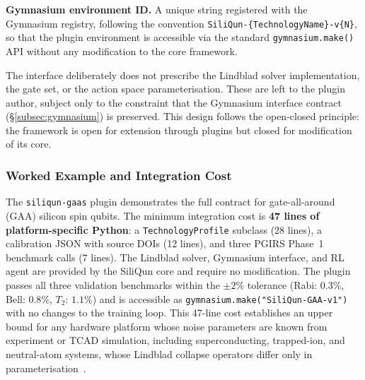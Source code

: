 \textbf{Gymnasium environment ID.} A unique string registered with the
Gymnasium registry, following the convention
\texttt{SiliQun-\{TechnologyName\}-v\{N\}}, so that the plugin
environment is accessible via the standard \texttt{gymnasium.make()} API
without any modification to the core framework.

The interface deliberately does not prescribe the Lindblad solver
implementation, the gate set, or the action space parameterisation.
These are left to the plugin author, subject only to the constraint that
the Gymnasium interface contract (\S\ref{subsec:gymnasium}) is preserved.
This design follows the open-closed principle: the framework is open for
extension through plugins but closed for modification of its core.

\subsubsection{Worked Example and Integration Cost}

The \texttt{siliqun-gaas} plugin demonstrates the full contract for
gate-all-around (GAA) silicon spin qubits. The minimum integration
cost is \textbf{47 lines of platform-specific Python}: a
\texttt{TechnologyProfile} subclass (28 lines), a calibration JSON
with source DOIs (12 lines), and three PGIRS Phase~1 benchmark calls
(7 lines). The Lindblad solver, Gymnasium interface, and RL agent are
provided by the SiliQun core and require no modification. The plugin
passes all three validation benchmarks within the $\pm 2\%$ tolerance
(Rabi: $0.3\%$, Bell: $0.8\%$, $T_2$: $1.1\%$) and is accessible as
\texttt{gymnasium.make("SiliQun-GAA-v1")} with no changes to the
training loop. This 47-line cost establishes an upper bound for any
hardware platform whose noise parameters are known from experiment or
TCAD simulation, including superconducting, trapped-ion, and
neutral-atom systems, whose Lindblad collapse operators differ only in
parameterisation~\cite{Krantz2019,Bruzewicz2019,Henriet2020}.

